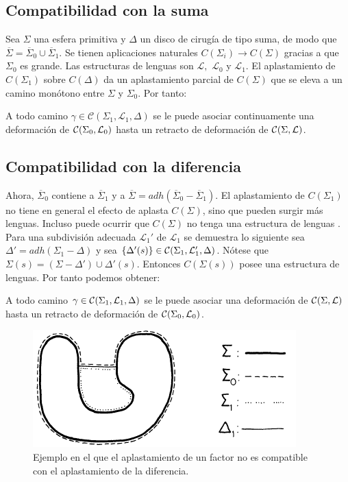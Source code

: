 \documentclass[twoside, 11pt]{article}
\newcommand{\LL}{\mathcal{L}}
\begin{document}
\subsection{Compatibilidad con la suma}

Sea $\Sigma$ una esfera primitiva y $\Delta$ un disco de cirugía de tipo suma, de modo que $\overline{\Sigma}=\overline{\Sigma}_0\cup\overline{\Sigma}_1$. Se tienen aplicaciones naturales $C(\Sigma_i)\to C(\Sigma)$ gracias a que $\Sigma_0$ es grande. Las estructuras de lenguas son $\LL,$ $\LL_0$ y $\LL_1$. El aplastamiento de $C(\Sigma_1)$ sobre $C(\Delta)$ da un aplastamiento parcial de $C(\Sigma)$ que se eleva a un camino monótono entre $\Sigma$ y $\Sigma_0$. Por tanto:
\begin{prop}
A todo camino $\gamma\in\mathcal{C}(\Sigma_1,\mathcal{L}_1,\Delta)$ se le puede asociar continuamente una deformación de $\CC(\Sigma_0,\LL_0)$ hasta un retracto de deformación de $\CC(\Sigma,\LL)$. 
\end{prop}

\subsection{Compatibilidad con la diferencia}

Ahora, $\overline{\Sigma}_0$ contiene a $\overline{\Sigma}_1$ y a $\overline{\Sigma}=adh(\overline{\Sigma}_0-\overline{\Sigma}_1)$. El aplastamiento de $C(\Sigma_1)$ no tiene en general el efecto de aplasta $C(\Sigma)$, sino que pueden surgir más lenguas. Incluso puede ocurrir que $C(\Sigma)$ no tenga una estructura de lenguas \cite[Sección 7]{Ha}. Para una subdivisión adecuada $\LL_1'$ de $\LL_1$ se demuestra lo siguiente \cite[Secciones 10 y 11]{Ha} sea $\Delta'=adh(\Sigma_1-\Delta)$ y sea $\{\Delta'(s)\}\in\CC(\Sigma_1,\LL_1',\Delta)$. Nótese que $\Sigma(s)=(\Sigma-\Delta')\cup\Delta'(s)$. Entonces $C(\Sigma(s))$ posee una estructura de lenguas. Por tanto podemos obtener:
  \begin{prop}
  A todo camino $\gamma\in\CC(\Sigma_1,\LL_1,\Delta)$ se le puede asociar una deformación de $\CC(\Sigma,\LL)$ hasta un retracto de deformación de $\CC(\Sigma_0,\LL_0)$. 
  \end{prop}
  
  \begin{figure}[h!]
  \includegraphics[scale=0.7]{ejemplo}
  \caption{Ejemplo en el que el aplastamiento de un factor no es compatible con el aplastamiento de la diferencia.}
  \end{figure}
  
\end{document}

